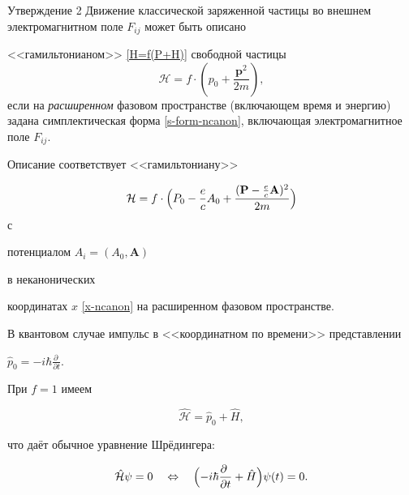 \begin{newthm}{Утверждение 2} Движение классической заряженной частицы во внешнем электромагнитном поле $F_{ij}$ может быть описано 

<<гамильтонианом>> \eqref{H=f(P+H)} свободной частицы $$\mathcal{H}=f\cdot(p_0+\frac{\mathbf{p}^2}{2m}),$$ если на \emph{расширенном} фазовом пространстве (включающем время и энергию) задана симплектическая форма  \eqref{s-form-ncanon}{\rm ,} включающая электромагнитное поле $F_{ij}.$

Описание соответствует <<гамильтониану>> 

$$\mathcal{H}=f\cdot\Bigl(P_0-\frac{e}{c}A_0+\frac{(\mathbf{P}-\frac{e}{c}\mathbf{A})^2}{2m}\Bigr)$$ с

потенциалом $A_i=(A_0,\mathbf{A})$


 в неканонических

координатах $x$ \eqref{x-ncanon} на расширенном фазовом пространстве{\rm .}

\end{newthm}




\smallskip




  В квантовом случае импульс в <<координатном по времени>> представлении

  $\hat p_0=-i\hbar\frac{\partial~}{\partial t}$.

  При $f=1$ имеем 

\begin{equation}\label{qHq}

\mathcal{\hat H}=\hat p_0+\hat H,

\end{equation} 

что даёт обычное уравнение Шрёдингера:

\begin{equation}\label{Hpsi=0}

  \mathcal{\hat H}\psi=0\quad\Leftrightarrow\quad

  \Bigl(-i\hbar\frac{\partial~}{\partial t}+\hat H\Bigr)\psi(t)=0.

\end{equation}



